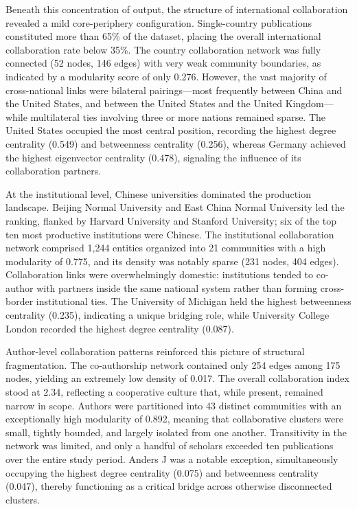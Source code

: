 \documentclass[12pt,a4paper]{article}
\begin{document}
Beneath this concentration of output, the structure of international collaboration revealed a mild core-periphery configuration. Single-country publications constituted more than 65\% of the dataset, placing the overall international collaboration rate below 35\%. The country collaboration network was fully connected (52 nodes, 146 edges) with very weak community boundaries, as indicated by a modularity score of only 0.276. However, the vast majority of cross-national links were bilateral pairings—most frequently between China and the United States, and between the United States and the United Kingdom—while multilateral ties involving three or more nations remained sparse. The United States occupied the most central position, recording the highest degree centrality (0.549) and betweenness centrality (0.256), whereas Germany achieved the highest eigenvector centrality (0.478), signaling the influence of its collaboration partners.

At the institutional level, Chinese universities dominated the production landscape. Beijing Normal University and East China Normal University led the ranking, flanked by Harvard University and Stanford University; six of the top ten most productive institutions were Chinese. The institutional collaboration network comprised 1,244 entities organized into 21 communities with a high modularity of 0.775, and its density was notably sparse (231 nodes, 404 edges). Collaboration links were overwhelmingly domestic: institutions tended to co-author with partners inside the same national system rather than forming cross-border institutional ties. The University of Michigan held the highest betweenness centrality (0.235), indicating a unique bridging role, while University College London recorded the highest degree centrality (0.087).

Author-level collaboration patterns reinforced this picture of structural fragmentation. The co-authorship network contained only 254 edges among 175 nodes, yielding an extremely low density of 0.017. The overall collaboration index stood at 2.34, reflecting a cooperative culture that, while present, remained narrow in scope. Authors were partitioned into 43 distinct communities with an exceptionally high modularity of 0.892, meaning that collaborative clusters were small, tightly bounded, and largely isolated from one another. Transitivity in the network was limited, and only a handful of scholars exceeded ten publications over the entire study period. Anders J was a notable exception, simultaneously occupying the highest degree centrality (0.075) and betweenness centrality (0.047), thereby functioning as a critical bridge across otherwise disconnected clusters.
\end{document}

